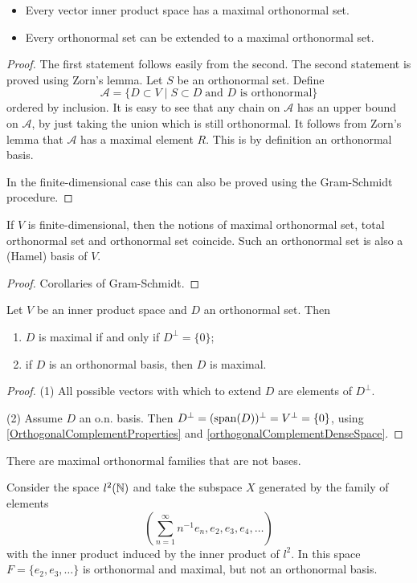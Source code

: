 \begin{proposition} \label{exitenceMaximalOrthonormalSet}
\begin{itemize}
\item Every vector inner product space has a maximal orthonormal set.
\item Every orthonormal set can be extended to a maximal orthonormal set.
\end{itemize}
\end{proposition}
\begin{proof}
The first statement follows easily from the second. The second statement is proved using Zorn's lemma. Let $S$ be an orthonormal set. Define
\[ \mathcal{A} = \{ D\subset V \;|\; S\subset D \; \text{and $D$ is orthonormal} \} \]
ordered by inclusion. It is easy to see that any chain on $\mathcal{A}$ has an upper bound on $\mathcal{A}$, by just taking the union which is still orthonormal. It follows from Zorn's lemma that $\mathcal{A}$ has a maximal element $R$. This is by definition an orthonormal basis.

In the finite-dimensional case this can also be proved using the Gram-Schmidt procedure.
\end{proof}

\begin{proposition}
If $V$ is finite-dimensional, then the notions of maximal orthonormal set, total orthonormal set and orthonormal set coincide. Such an orthonormal set is also a (Hamel) basis of $V$.
\end{proposition}
\begin{proof}
Corollaries of Gram-Schmidt.
\end{proof}

\begin{lemma} \label{characterisationMaximalOrthonormalSet}
Let $V$ be an inner product space and $D$ an orthonormal set. Then
\begin{enumerate}
\item $D$ is maximal \textup{if and only if} $D^\perp = \{0\}$;
\item if $D$ is an orthonormal basis, then $D$ is maximal.
\end{enumerate}
\end{lemma}
\begin{proof}
(1) All possible vectors with which to extend $D$ are elements of $D^\perp$. 

(2) Assume $D$ an o.n. basis. Then $D^\perp = (\operatorname{span}(D))^\perp = V^\perp = \{0\}$, using \ref{OrthogonalComplementProperties} and \ref{orthogonalComplementDenseSpace}.
\end{proof}
There are maximal orthonormal families that are not bases.
\begin{example}
Consider the space $l^2(\mathbb{N})$ and take the subspace $X$ generated by the family of elements
\[ \left( \sum_{n=1}^\infty n^{-1}e_n, e_2,e_3,e_4,\ldots \right) \]
with the inner product induced by the inner product of $l^2$. In this space $F=\{e_2,e_3,\ldots\}$ is orthonormal and maximal, but not an orthonormal basis.
\end{example}


